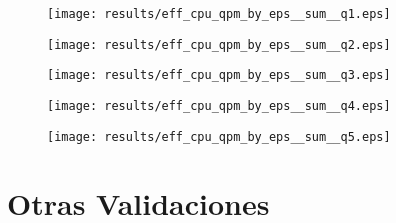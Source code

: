 \begin{figure}[H]
	\centering
	\texttt{[image: results/eff\_cpu\_qpm\_by\_eps\_\_sum\_\_q1.eps]}
	\caption[]
	{\small }
	\label{img:result_eff_cpu_qpm_by_eps__sum__q1}
\end{figure}
\begin{figure}[H]
	\centering
	\texttt{[image: results/eff\_cpu\_qpm\_by\_eps\_\_sum\_\_q2.eps]}
	\caption[]
	{\small }
	\label{img:result_eff_cpu_qpm_by_eps__sum__q2}
\end{figure}
\begin{figure}[H]
	\centering
	\texttt{[image: results/eff\_cpu\_qpm\_by\_eps\_\_sum\_\_q3.eps]}
	\caption[]
	{\small }
	\label{img:result_eff_cpu_qpm_by_eps__sum__q3}
\end{figure}
\begin{figure}[H]
	\centering
	\texttt{[image: results/eff\_cpu\_qpm\_by\_eps\_\_sum\_\_q4.eps]}
	\caption[]
	{\small }
	\label{img:result_eff_cpu_qpm_by_eps__sum__q4}
\end{figure}
\begin{figure}[H]
	\centering
	\texttt{[image: results/eff\_cpu\_qpm\_by\_eps\_\_sum\_\_q5.eps]}
	\caption[]
	{\small }
	\label{img:result_eff_cpu_qpm_by_eps__sum__q5}
\end{figure}


\section{Otras Validaciones}

